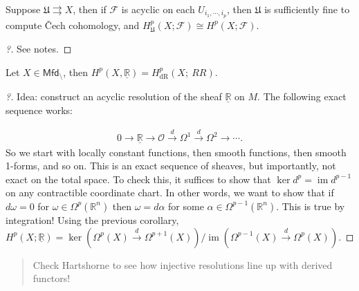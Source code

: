 \begin{corollary}

Suppose \(\mathfrak{U}\rightrightarrows X\), then if \(\mathcal{F}\) is
acyclic on each \(U_{i_1, \cdots, i_p}\), then \(\mathfrak{U}\) is
sufficiently fine to compute Čech cohomology, and
\(H^p_{\mathfrak{U}}(X; \mathcal{F}) \cong H^p(X; \mathcal{F})\).

\end{corollary}

\begin{proof}[?]

See notes.

\end{proof}

\begin{corollary}[of corollary]

Let \(X \in {\mathsf{Mfd}}_\setminus\), then
\(H^p(X, \underline{{\mathbb{R}}}) = H^p_{\mathrm{dR}}(X;\ RR)\).

\end{corollary}

\begin{proof}[?]

Idea: construct an acyclic resolution of the sheaf
\(\underline{{\mathbb{R}}}\) on \(M\). The following exact sequence
works:

\begin{align*}
0 \to \underline{{\mathbb{R}}} \to {\mathcal{O}}\xrightarrow{d} \Omega^1 \xrightarrow{d} \Omega^2 \to \cdots
.\end{align*}
So we start with locally constant functions, then smooth functions, then
smooth 1-forms, and so on. This is an exact sequence of sheaves, but
importantly, not exact on the total space. To check this, it suffices to
show that \(\ker d^p = \operatorname{im}d^{p-1}\) on any contractible
coordinate chart. In other words, we want to show that if \(d \omega=0\)
for \(\omega\in \Omega^p({\mathbb{R}}^n)\) then \(\omega= d \alpha\) for
some \(\alpha\in \Omega^{p-1}({\mathbb{R}}^n)\). This is true by
integration! Using the previous corollary,
\(H^p(X; \underline{{\mathbb{R}}}) = \ker(\Omega^p(X) \xrightarrow{d} \Omega^{p+1}(X) ) / \operatorname{im}(\Omega^{p-1}(X) \xrightarrow{d} \Omega^p(X))\).

\end{proof}

\begin{quote}
Check Hartshorne to see how injective resolutions line up with derived
functors!
\end{quote}

